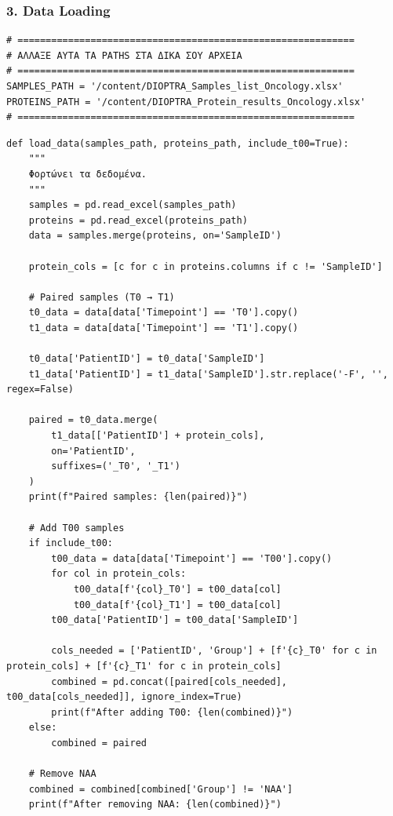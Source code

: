 \subsubsection*{3. Data Loading}
 
\begin{lstlisting}
# ============================================================
# ΑΛΛΑΞΕ ΑΥΤΑ ΤΑ PATHS ΣΤΑ ΔΙΚΑ ΣΟΥ ΑΡΧΕΙΑ
# ============================================================
SAMPLES_PATH = '/content/DIOPTRA_Samples_list_Oncology.xlsx'
PROTEINS_PATH = '/content/DIOPTRA_Protein_results_Oncology.xlsx'
# ============================================================
\end{lstlisting}
 
\begin{lstlisting}
def load_data(samples_path, proteins_path, include_t00=True):
    """
    Φορτώνει τα δεδομένα.
    """
    samples = pd.read_excel(samples_path)
    proteins = pd.read_excel(proteins_path)
    data = samples.merge(proteins, on='SampleID')
 
    protein_cols = [c for c in proteins.columns if c != 'SampleID']
 
    # Paired samples (T0 → T1)
    t0_data = data[data['Timepoint'] == 'T0'].copy()
    t1_data = data[data['Timepoint'] == 'T1'].copy()
 
    t0_data['PatientID'] = t0_data['SampleID']
    t1_data['PatientID'] = t1_data['SampleID'].str.replace('-F', '', regex=False)
 
    paired = t0_data.merge(
        t1_data[['PatientID'] + protein_cols],
        on='PatientID',
        suffixes=('_T0', '_T1')
    )
    print(f"Paired samples: {len(paired)}")
 
    # Add T00 samples
    if include_t00:
        t00_data = data[data['Timepoint'] == 'T00'].copy()
        for col in protein_cols:
            t00_data[f'{col}_T0'] = t00_data[col]
            t00_data[f'{col}_T1'] = t00_data[col]
        t00_data['PatientID'] = t00_data['SampleID']
 
        cols_needed = ['PatientID', 'Group'] + [f'{c}_T0' for c in protein_cols] + [f'{c}_T1' for c in protein_cols]
        combined = pd.concat([paired[cols_needed], t00_data[cols_needed]], ignore_index=True)
        print(f"After adding T00: {len(combined)}")
    else:
        combined = paired
 
    # Remove NAA
    combined = combined[combined['Group'] != 'NAA']
    print(f"After removing NAA: {len(combined)}")
 

\end{lstlisting}
